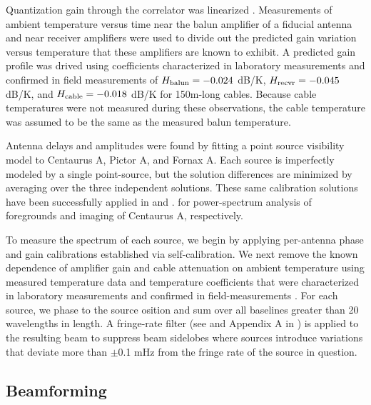 \documentclass[preprint]{aastex}
\begin{document}
Quantization gain through the correlator was linearized \citep{parsons_et_al2008}.
Measurements of ambient temperature versus time near the balun amplifier of a fiducial antenna and near
receiver amplifiers were used to divide out the predicted gain variation versus temperature that these amplifiers
are known to exhibit.  A predicted gain profile was drived using coefficients characterized in
laboratory measurements \citep{parashare_bradley2009} and
confirmed in field measurements \citep{pober_et_al2011} of $H_{\rm balun}=-0.024$ dB/K, $H_{\rm recvr}=-0.045$
dB/K, and $H_{\rm cable}=-0.018$ dB/K for 150m-long cables.  Because cable temperatures were not measured
during these observations, the cable temperature was assumed to be the same as the measured balun temperature.


Antenna delays and amplitudes were found by fitting a point source visibility
model to Centaurus A, Pictor A, and Fornax A.  Each source is imperfectly
modeled by a single point-source, but the solution differences are minimized by
averaging over the three independent solutions. These same calibration
solutions have been successfully applied in \citet{Pober:2013XXX} and \citet{Stefan:2013:XXX}.
for power-spectrum analysis of foregrounds and imaging of Centaurus A, respectively.

To measure the spectrum of each source, we begin by applying per-antenna phase and gain
calibrations established via self-calibration.  We next remove
the known dependence of amplifier gain and cable attenuation on ambient temperature 
using measured temperature data and temperature coefficients that were characterized in
laboratory measurements \citep{parashare_bradley2009} and confirmed 
in field-measurements \citep{pober_et_al2012}.  For each source, we phase to the source 
osition
and sum over 
all baselines greater than 20 wavelengths in length.
A fringe-rate filter (see \citet{parsons_backer2009} and Appendix A in \citet{Parsons2013b})
is applied to the resulting
beam to suppress beam sidelobes where sources introduce variations that deviate more than 
$\pm$0.1 mHz from the fringe rate of the source in question.


\subsection{Beamforming}
\end{document}
